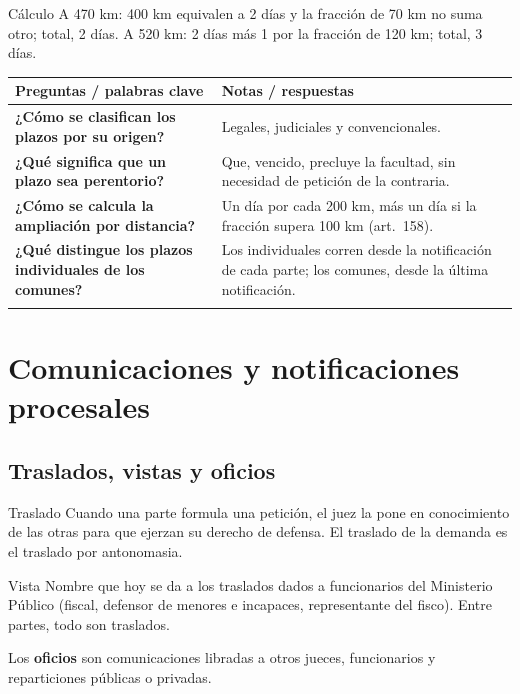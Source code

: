 \documentclass[12pt,oneside]{book}
\newenvironment{cornell}[1]{%
  \par\medskip\noindent{\small\bfseries Cuadro Cornell: #1}\par\smallskip
  \begin{longtable}{|>{\RaggedRight\arraybackslash}p{0.27\textwidth}|>{\RaggedRight\arraybackslash}p{0.66\textwidth}|}
  \hline
  \textbf{\small Preguntas / palabras clave} & \textbf{\small Notas / respuestas} \\ \hline\endhead
}{\end{longtable}\par\medskip}
\newcommand{\cqa}[2]{\textbf{#1} & #2 \\ \hline}
\newcommand{\cornellsummary}[1]{\multicolumn{2}{|p{0.95\textwidth}|}{\textbf{Resumen:} #1} \\ \hline}
\begin{document}
\begin{ejemplo}{Cálculo}
A 470 km: 400 km equivalen a 2 días y la fracción de 70 km no suma otro; total, 2 días. A 520 km: 2 días más 1 por la fracción de 120 km; total, 3 días.
\end{ejemplo}

\begin{cornell}{plazos}
\cqa{¿Cómo se clasifican los plazos por su origen?}{Legales, judiciales y convencionales.}
\cqa{¿Qué significa que un plazo sea perentorio?}{Que, vencido, precluye la facultad, sin necesidad de petición de la contraria.}
\cqa{¿Cómo se calcula la ampliación por distancia?}{Un día por cada 200 km, más un día si la fracción supera 100 km (art.~158).}
\cqa{¿Qué distingue los plazos individuales de los comunes?}{Los individuales corren desde la notificación de cada parte; los comunes, desde la última notificación.}
\cornellsummary{Los plazos pueden ser legales, judiciales o convencionales, y en el sistema preclusivo vencido el plazo se pierde la facultad. Se amplían por distancia y son individuales salvo los comunes, como el de alegar.}
\end{cornell}

\chapter{Comunicaciones y notificaciones procesales}
\label{cap:notificaciones}

\section{Traslados, vistas y oficios}

\begin{definicion}{Traslado}
Cuando una parte formula una petición, el juez la pone en conocimiento de las otras para que ejerzan su derecho de defensa. El traslado de la demanda es el traslado por antonomasia.
\end{definicion}

\begin{definicion}{Vista}
Nombre que hoy se da a los traslados dados a funcionarios del Ministerio Público (fiscal, defensor de menores e incapaces, representante del fisco). Entre partes, todo son traslados.
\end{definicion}

Los \textbf{oficios} son comunicaciones libradas a otros jueces, funcionarios y reparticiones públicas o privadas.
\end{document}

